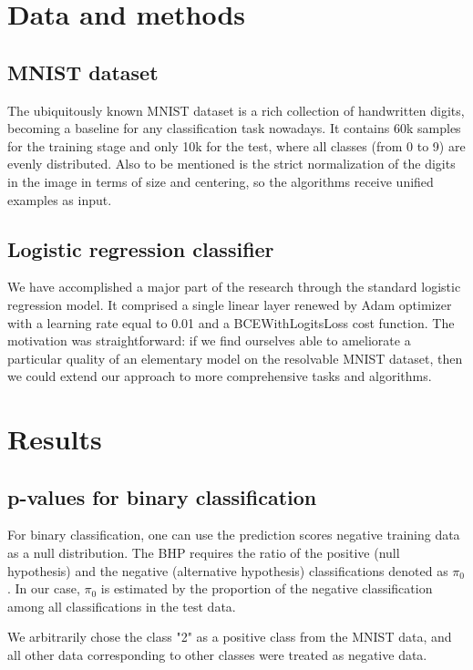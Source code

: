 \documentclass{article}
\begin{document}
\section{Data and methods}
\subsection{MNIST dataset}

The ubiquitously known MNIST dataset is a rich collection of handwritten digits, becoming a baseline for any classification task nowadays. It contains 60k samples for the training stage and only 10k for the test, where all classes (from 0 to 9) are evenly distributed. Also to be mentioned is the strict normalization of the digits in the image in terms of size and centering, so the algorithms receive unified examples as input.

\subsection{Logistic regression classifier}

We have accomplished a major part of the research through the standard logistic regression model. It comprised a single linear layer renewed by Adam optimizer with a learning rate equal to 0.01 and a BCEWithLogitsLoss cost function. The motivation was straightforward: if we find ourselves able to ameliorate a particular quality of an elementary model on the resolvable MNIST dataset, then we could extend our approach to more comprehensive tasks and algorithms.


\section{Results}

\subsection{p-values for binary classification}

For binary classification, one can use the prediction scores negative training data as a null distribution. The BHP requires the ratio of the positive (null hypothesis) and the negative (alternative hypothesis) classifications denoted as $\pi_0$. In our case, $\pi_0$ is estimated by the proportion of the negative classification among all classifications in the test data.  

We arbitrarily chose the class "2" as a positive class from the MNIST data, and all other data corresponding to other classes were treated as negative data.
\end{document}
